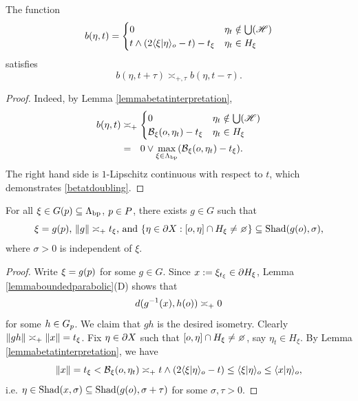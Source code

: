 \begin{corollary}
\label{corollarybetat}
The function
\begin{equation}
\label{betat}
b(\eta,t) = \begin{cases}
0 & \eta_t\notin\bigcup(\mathscr H) \\
t\wedge(2\langle \xi|\eta\rangle_o - t) - t_\xi & \eta_t\in H_\xi
\end{cases}
\end{equation}
satisfies
\begin{equation}
\label{betatdoubling}
b(\eta,t + \tau) \asymp_{\plus,\tau} b(\eta,t - \tau).
\end{equation}
\end{corollary}
\begin{proof}
Indeed, by Lemma \ref{lemmabetatinterpretation},
\begin{align*}
b(\eta,t) &\asymp_\plus \begin{cases}
0 & \eta_t\notin\bigcup(\scrH) \\
\busemann_\xi(\zero,\eta_t) - t_\xi & \eta_t\in H_\xi
\end{cases}\\
&=_\pt 0\vee \max_{\xi\in\Lbp} (\busemann_\xi(\zero,\eta_t) - t_\xi).
\end{align*}
The right hand side is $1$-Lipschitz continuous with respect to $t$, which demonstrates \eqref{betatdoubling}.
\end{proof}



\begin{lemma}
\label{lemmatop}
For all $\xi\in G(p) \subseteq \Lambda_{\mathrm{bp}}$, $p\in P$, there exists $g\in G$ such that
\begin{equation}
\label{top}
\text{$\xi = g(\bp)$, $\dogo g \asymp_\plus t_\xi$, and $\{\eta\in\del X  : \geo\zero\eta\cap H_\xi\neq\emptyset \} \subset \Shad(g(\zero),\sigma)$,}
\end{equation}
where $\sigma > 0$ is independent of $\xi$.
\end{lemma}
\begin{proof}
Write $\xi = g(p)$ for some $g\in G$. Since $x := \xi_{t_\xi} \in \partial H_\xi$, Lemma \ref{lemmaboundedparabolic}(D) shows that
\[
d(g^{-1}(x),h(o)) \asymp_+ 0
\]
for some $h\in G_p$. We claim that $gh$ is the desired isometry. Clearly $\|gh\| \asymp_+ \|x\| = t_\xi$. Fix $\eta\in\partial X$ such that $\geo\zero\eta\cap H_\xi\neq\emptyset$, say $\eta_t\in H_\xi$. By Lemma \ref{lemmabetatinterpretation}, we have
\[
\|x\| = t_\xi < \operatorname{\mathcal B}_\xi(o,\eta_t) \asymp_+ t\wedge(2\langle \xi|\eta\rangle_o - t) \leq \langle \xi|\eta\rangle_o \leq \langle x|\eta\rangle_o,
\]
i.e. $\eta\in \operatorname{Shad}(x,\sigma) \subseteq \operatorname{Shad}(g(o),\sigma + \tau)$ for some $\sigma,\tau > 0$.
\end{proof}

